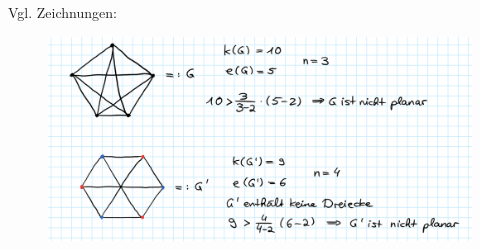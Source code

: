 \begin{problem*}[1b]
  Vgl. Zeichnungen:
  \begin{figure}[H]
    \includegraphics[width=\linewidth]{assets/images/Abb1-15-12.png}
  \end{figure}
\end{problem*}

